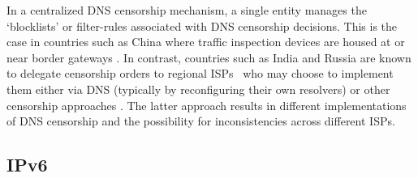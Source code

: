 In a centralized DNS censorship mechanism, a single entity manages the
`blocklists' or filter-rules associated with DNS censorship decisions. This is
the case in countries such as China where traffic inspection devices are housed
at or near border gateways \cite{xu2011internet}. In contrast, countries such
as India and Russia are known to delegate censorship orders to regional
ISPs~\cite{Gosain2017a}
who may choose to implement them either via DNS (typically by reconfiguring
their own resolvers) or other censorship approaches
\cite{ramesh2020decentralized, Yadav2018a, singh2020india}. The latter approach results in
different implementations of DNS censorship and the possibility for
inconsistencies across different ISPs.

% 
\subsection{IPv6} \label{sec:v4vsv6-background:ipv6}

